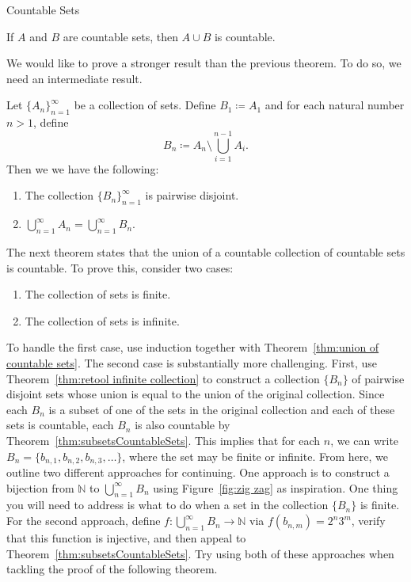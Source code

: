 \begin{section}{Countable Sets}
\begin{theorem}\label{thm:union of countable sets}
If $A$ and $B$ are countable sets, then $A\cup B$ is countable.
\end{theorem}

We would like to prove a stronger result than the previous theorem. To do so, we need an intermediate result. 

\begin{theorem}\label{thm:retool infinite collection}
Let $\{A_n\}_{n=1}^{\infty}$ be a collection of sets. Define $B_1\coloneqq A_1$ and for each natural number $n>1$, define
\[
B_n\coloneqq A_n\setminus \bigcup_{i=1}^{n-1}A_i.
\]
Then we we have the following:
\begin{enumerate}[label=\textrm{(\alph*)}]
\item The collection $\{B_n\}_{n=1}^{\infty}$ is pairwise disjoint.
\item $\displaystyle \bigcup_{n=1}^{\infty}A_n =\bigcup_{n=1}^{\infty}B_n$.
\end{enumerate}
\end{theorem}

The next theorem states that the union of a countable collection of countable sets is countable. To prove this, consider two cases:
\begin{enumerate}
\item The collection of sets is finite.  
\item The collection of sets is infinite.
\end{enumerate}
To handle the first case, use induction together with Theorem~\ref{thm:union of countable sets}. The second case is substantially more challenging.  First, use Theorem~\ref{thm:retool infinite collection} to construct a collection $\{B_n\}$ of pairwise disjoint sets whose union is equal to the union of the original collection. Since each $B_n$ is a subset of one of the sets in the original collection and each of these sets is countable, each $B_n$ is also countable by Theorem~\ref{thm:subsetsCountableSets}. This implies that for each $n$, we can write $B_n=\{b_{n,1}, b_{n,2},b_{n,3},\ldots\}$, where the set may be finite or infinite. From here, we outline two different approaches for continuing.  One approach is to construct a bijection from $\mathbb{N}$ to $\bigcup_{n=1}^{\infty}B_n$ using Figure~\ref{fig:zig zag} as inspiration.  One thing you will need to address is what to do when a set in the collection $\{B_n\}$ is finite. For the second approach, define $f:\bigcup_{n=1}^{\infty}B_n\to \mathbb{N}$ via $f(b_{n,m})=2^n3^m$, verify that this function is injective, and then appeal to Theorem~\ref{thm:subsetsCountableSets}.  Try using both of these approaches when tackling the proof of the following theorem.


\end{section}
